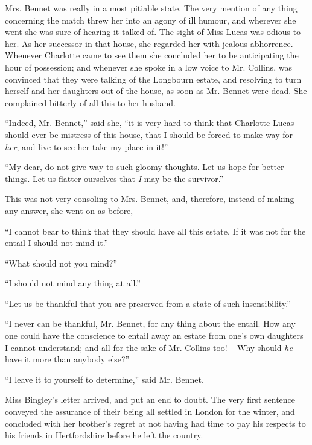 Mrs. Bennet was really in a most pitiable state. The
very mention of any thing concerning the match threw
her into an agony of ill humour, and wherever she went
she was sure of hearing it talked of. The sight of Miss
Lucas was odious to her. As her successor in that house,
she regarded her with jealous abhorrence. Whenever
Charlotte came to see them she concluded her to be
anticipating the hour of possession; and whenever she
spoke in a low voice to Mr. Collins, was convinced that
they were talking of the Longbourn estate, and resolving
to turn herself and her daughters out of the house, as soon
as Mr. Bennet were dead. She complained bitterly of all
this to her husband.

“Indeed, Mr. Bennet,” said she, “it is very hard to
think that Charlotte Lucas should ever be mistress of
this house, that I should be forced to make way for \textit{her},
and live to see her take my place in it!”

“My dear, do not give way to such gloomy thoughts.
Let us hope for better things. Let us flatter ourselves
that \textit{I} may be the survivor.”

This was not very consoling to Mrs. Bennet, and, therefore,
instead of making any answer, she went on as before,

“I cannot bear to think that they should have all
this estate. If it was not for the entail I should not
mind it.”

“What should not you mind?”

“I should not mind any thing at all.”

“Let us be thankful that you are preserved from a state
of such insensibility.”

“I never can be thankful, Mr. Bennet, for any thing
about the entail. How any one could have the conscience
to entail away an estate from one’s own daughters
I cannot understand; and all for the sake of Mr. Collins
too! -- Why should \textit{he} have it more than anybody else?”

“I leave it to yourself to determine,” said Mr. Bennet.




Miss Bingley’s letter arrived, and put an end to doubt.
The very first sentence conveyed the assurance of their
being all settled in London for the winter, and concluded
with her brother’s regret at not having had time to pay
his respects to his friends in Hertfordshire before he left
the country.

